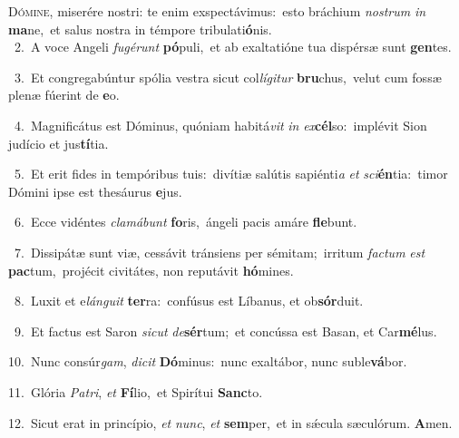 \lettrine{\initial\textcolor{\initialcolor}{D}}{ómine,} miserére nostri: te enim exspectávimus:~\dagger esto bráchium \textit{nos}\-\textit{trum} \textit{in} \textbf{ma}\-ne,~\star et salus nostra in témpore tribulati\-\textbf{ó}\-nis.\\
{\numbfont\textcolor{\numbcolor}{~2.}}~A voce Angeli \textit{fu}\-\textit{gé}\textit{runt} \textbf{pó}\-puli,~\star et ab exaltatióne tua dispérsæ sunt \textbf{gen}\-tes.\par
{\numbfont\textcolor{\numbcolor}{~3.}}~Et congregabúntur spólia vestra sicut col\-\textit{lí}\-\textit{gi}\textit{tur} \textbf{bru}\-chus,~\star velut cum fossæ plenæ fúerint de \textbf{e}\-o.\par
{\numbfont\textcolor{\numbcolor}{~4.}}~Magnificátus est Dóminus, quóniam habitá\textit{vit} \textit{in} \textit{ex}\-\textbf{cél}so:~\star implévit Sion judício et jus\-\textbf{tí}\-tia.\par
{\numbfont\textcolor{\numbcolor}{~5.}}~Et erit fides in tempóribus tuis:~\dagger divítiæ salútis sapiénti\textit{a} \textit{et} \textit{sci}\-\textbf{én}tia:~\star timor Dómini ipse est thesáurus \textbf{e}\-jus.\par
{\numbfont\textcolor{\numbcolor}{~6.}}~Ecce vidéntes \textit{cla}\-\textit{má}\textit{bunt} \textbf{fo}\-ris,~\star ángeli pacis amáre \textbf{fle}\-bunt.\par
{\numbfont\textcolor{\numbcolor}{~7.}}~Dissipátæ sunt viæ, cessávit tránsiens per sémitam;~\dagger irritum \textit{fac}\-\textit{tum} \textit{est} \textbf{pac}\-tum,~\star projécit civitátes, non reputávit \textbf{hó}\-mines.\par
{\numbfont\textcolor{\numbcolor}{~8.}}~Luxit et e\-\textit{lán}\-\textit{gu}\textit{it} \textbf{ter}\-ra:~\star confúsus est Líbanus, et ob\-\textbf{sór}\-duit.\par
{\numbfont\textcolor{\numbcolor}{~9.}}~Et factus est Saron \textit{sic}\-\textit{ut} \textit{de}\-\textbf{sér}tum;~\star et concússa est Basan, et Car\-\textbf{mé}\-lus.\par
{\numbfont\textcolor{\numbcolor}{10.}}~Nunc consúr\-\textit{gam}\-, \textit{di}\-\textit{cit} \textbf{Dó}\-minus:~\star nunc exaltábor, nunc suble\-\textbf{vá}\-bor.\par
{\numbfont\textcolor{\numbcolor}{11.}}~Glória \textit{Pa}\-\textit{tri}, \textit{et} \textbf{Fí}\-lio,~\star et Spirítui \textbf{Sanc}\-to.\par
{\numbfont\textcolor{\numbcolor}{12.}}~Sicut erat in princípio, \textit{et} \textit{nunc}\-, \textit{et} \textbf{sem}\-per,~\star et in sǽcula sæculórum. \textbf{A}\-men.\par
